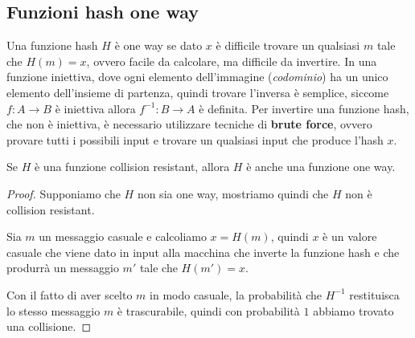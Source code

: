 \subsection{Funzioni hash one way}
Una funzione hash $H$ è one way se dato $x$ è difficile trovare un qualsiasi $m$ tale che $H(m) = x$,
ovvero facile da calcolare, ma difficile da invertire. In una funzione iniettiva, dove ogni elemento
dell'immagine (\textit{codominio}) ha un unico elemento dell'insieme di partenza, quindi 
trovare l'inversa è semplice, siccome $f: A \rightarrow B$ è iniettiva
allora $f^{-1}: B \rightarrow A$ è definita. Per invertire una funzione hash, che non è iniettiva,
è necessario utilizzare tecniche di \textbf{brute force}, ovvero provare tutti i possibili input
e trovare un qualsiasi input che produce l'hash $x$.

\begin{proposizione}
  Se $H$ è una funzione collision resistant, allora $H$ è anche una funzione one way.
\end{proposizione}
\begin{proof}
  Supponiamo che $H$ non sia one way, mostriamo quindi che $H$ non è collision resistant. 

  Sia $m$ un messaggio casuale e calcoliamo $x = H(m)$, quindi $x$ è un valore casuale che 
  viene dato in input alla macchina che inverte la funzione hash e che produrrà un messaggio
  $m'$ tale che $H(m') = x$.

  \begin{figure}[H]
    \centering
  \end{figure}

  Con il fatto di aver scelto $m$ in modo casuale, la probabilità che $H^{-1}$ restituisca lo stesso 
  messaggio $m$ è trascurabile, quindi con probabilità $1$ abbiamo trovato una collisione.
\end{proof}
